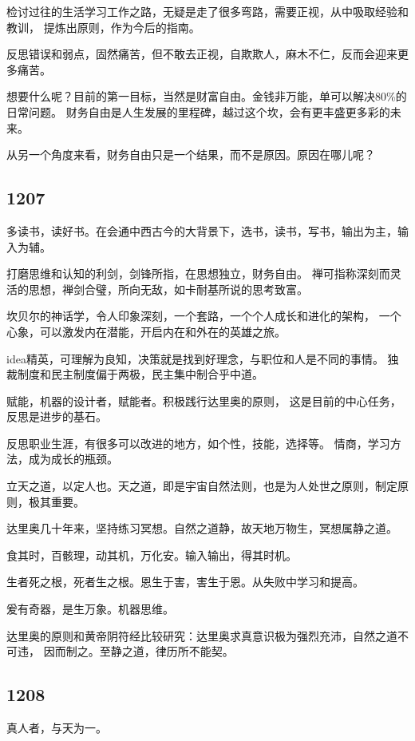 检讨过往的生活学习工作之路，无疑是走了很多弯路，需要正视，从中吸取经验和教训，
提炼出原则，作为今后的指南。

反思错误和弱点，固然痛苦，但不敢去正视，自欺欺人，麻木不仁，反而会迎来更多痛苦。

想要什么呢？目前的第一目标，当然是财富自由。金钱非万能，单可以解决80\%的日常问题。
财务自由是人生发展的里程碑，越过这个坎，会有更丰盛更多彩的未来。

从另一个角度来看，财务自由只是一个结果，而不是原因。原因在哪儿呢？

\subsection{1207}

多读书，读好书。在会通中西古今的大背景下，选书，读书，写书，输出为主，输入为辅。

打磨思维和认知的利剑，剑锋所指，在思想独立，财务自由。
禅可指称深刻而灵活的思想，禅剑合璧，所向无敌，如卡耐基所说的思考致富。

坎贝尔的神话学，令人印象深刻，一个套路，一个个人成长和进化的架构，
一个心象，可以激发内在潜能，开启内在和外在的英雄之旅。

idea精英，可理解为良知，决策就是找到好理念，与职位和人是不同的事情。
独裁制度和民主制度偏于两极，民主集中制合乎中道。

赋能，机器的设计者，赋能者。积极践行达里奥的原则，
这是目前的中心任务，反思是进步的基石。

反思职业生涯，有很多可以改进的地方，如个性，技能，选择等。
情商，学习方法，成为成长的瓶颈。

立天之道，以定人也。天之道，即是宇宙自然法则，也是为人处世之原则，制定原则，极其重要。

达里奥几十年来，坚持练习冥想。自然之道静，故天地万物生，冥想属静之道。

食其时，百骸理，动其机，万化安。输入输出，得其时机。

生者死之根，死者生之根。恩生于害，害生于恩。从失败中学习和提高。

爰有奇器，是生万象。机器思维。

达里奥的原则和黄帝阴符经比较研究：达里奥求真意识极为强烈充沛，自然之道不可违，
因而制之。至静之道，律历所不能契。

\subsection{1208}

真人者，与天为一。

